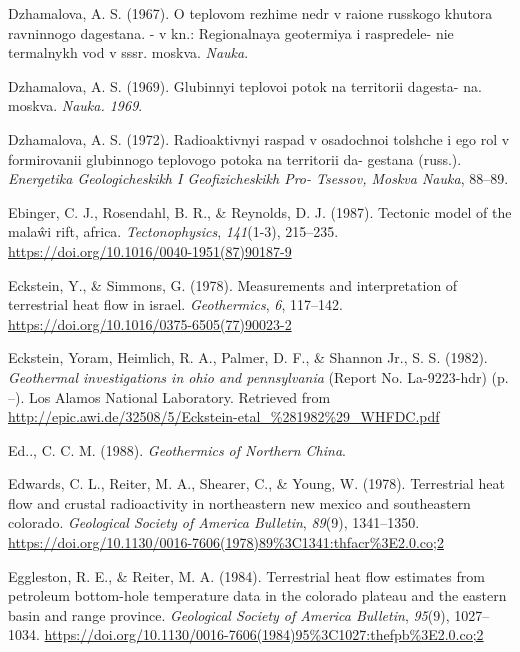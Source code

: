 \documentclass[draft,linenumbers]{agujournal2018}
\begin{document}
\leavevmode{}%
Dzhamalova, A. S. (1967). O teplovom rezhime nedr v raione russkogo
khutora ravninnogo dagestana. - v kn.: Regionalnaya geotermiya i
raspredele- nie termalnykh vod v sssr. moskva. \emph{Nauka}.

\leavevmode{}%
Dzhamalova, A. S. (1969). Glubinnyi teplovoi potok na territorii
dagesta- na. moskva. \emph{Nauka. 1969}.

\leavevmode{}%
Dzhamalova, A. S. (1972). Radioaktivnyi raspad v osadochnoi tolshche i
ego rol v formirovanii glubinnogo teplovogo potoka na territorii da-
gestana (russ.). \emph{Energetika Geologicheskikh I Geofizicheskikh Pro-
Tsessov, Moskva Nauka}, 88--89.

\leavevmode{}%
Ebinger, C. J., Rosendahl, B. R., \& Reynolds, D. J. (1987). Tectonic
model of the malaŵi rift, africa. \emph{Tectonophysics},
\emph{141}(1-3), 215--235.
\url{https://doi.org/10.1016/0040-1951(87)90187-9}

\leavevmode{}%
Eckstein, Y., \& Simmons, G. (1978). Measurements and interpretation of
terrestrial heat flow in israel. \emph{Geothermics}, \emph{6}, 117--142.
\url{https://doi.org/10.1016/0375-6505(77)90023-2}

\leavevmode{}%
Eckstein, Yoram, Heimlich, R. A., Palmer, D. F., \& Shannon Jr., S. S.
(1982). \emph{Geothermal investigations in ohio and pennsylvania}
(Report No. La-9223-hdr) (p. --). Los Alamos National Laboratory.
Retrieved from
\url{http://epic.awi.de/32508/5/Eckstein-etal_\%281982\%29_WHFDC.pdf}

\leavevmode{}%
Ed.., C. C. M. (1988). \emph{Geothermics of Northern China}.

\leavevmode{}%
Edwards, C. L., Reiter, M. A., Shearer, C., \& Young, W. (1978).
Terrestrial heat flow and crustal radioactivity in northeastern new
mexico and southeastern colorado. \emph{Geological Society of America
Bulletin}, \emph{89}(9), 1341--1350.
\url{https://doi.org/10.1130/0016-7606(1978)89\%3C1341:thfacr\%3E2.0.co;2}

\leavevmode{}%
Eggleston, R. E., \& Reiter, M. A. (1984). Terrestrial heat flow
estimates from petroleum bottom-hole temperature data in the colorado
plateau and the eastern basin and range province. \emph{Geological
Society of America Bulletin}, \emph{95}(9), 1027--1034.
\url{https://doi.org/10.1130/0016-7606(1984)95\%3C1027:thefpb\%3E2.0.co;2}
\end{document}
